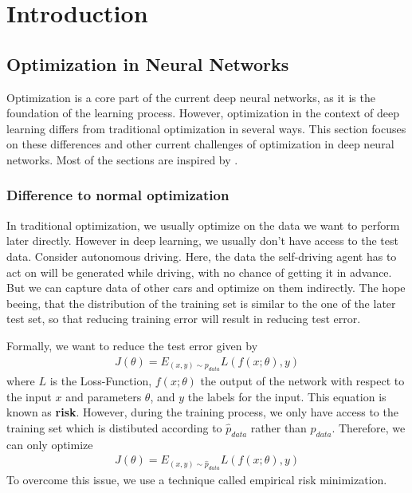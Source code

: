 \chapter{Introduction}
\section{Optimization in Neural Networks}
Optimization is a core part of the current deep neural networks, as it is the
foundation of the learning process. However, optimization in the context of deep
learning differs from traditional optimization in several ways. This section
focuses on these differences and other current challenges of optimization in
deep neural networks. Most of the sections are inspired by
\cite{Goodfellow-et-al-2016}.

\subsection{Difference to normal optimization}\label{sub:1}
In traditional optimization, we usually optimize on the data we want to perform
later directly. However in deep learning, we usually don't have access to the
test data. Consider autonomous driving. Here, the data the self-driving agent
has to act on will be generated while driving, with no chance of getting it in
advance. But we can capture data of other cars and optimize on them indirectly.
The hope beeing, that the distribution of the training set is similar to the one
of the later test set, so that reducing training error will result in reducing
test error.

Formally, we want to reduce the test error given by
\begin{align}\label{eq:1}
    J(\theta) = E_{(x,y)\sim p_{data}} L(f(x;\theta), y)
\end{align}
where $L$ is the Loss-Function, $f(x;\theta)$ the output of the network with
respect to the input $x$ and parameters $\theta$, and $y$ the labels for the
input. This equation is known as \textbf{risk}. However, during the training
process, we only have access to the training set which is distibuted according 
to $\hat{p}_{data}$ rather than $p_{data}$. Therefore, we can only optimize
\begin{align}
    J(\theta) = E_{(x,y)\sim \hat{p}_{data}} L(f(x;\theta), y)
\end{align}
To overcome this issue, we use a technique called empirical risk minimization.

